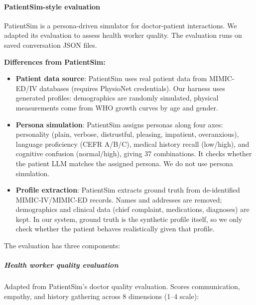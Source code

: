 
\paragraph{PatientSim-style evaluation}

PatientSim is a persona-driven simulator for doctor-patient interactions. We adapted its evaluation to assess health worker quality. The evaluation runs on saved conversation JSON files.

\textbf{Differences from PatientSim:}
\begin{itemize}
    \item \textbf{Patient data source}: PatientSim uses real patient data from MIMIC-ED/IV databases (requires PhysioNet credentials). Our harness uses generated profiles: demographics are randomly simulated, physical measurements come from WHO growth curves by age and gender.
    \item \textbf{Persona simulation}: PatientSim assigns personas along four axes: personality (plain, verbose, distrustful, pleasing, impatient, overanxious), language proficiency (CEFR A/B/C), medical history recall (low/high), and cognitive confusion (normal/high), giving 37 combinations. It checks whether the patient LLM matches the assigned persona. We do not use persona simulation.
    \item \textbf{Profile extraction}: PatientSim extracts ground truth from de-identified MIMIC-IV/MIMIC-ED records. Names and addresses are removed; demographics and clinical data (chief complaint, medications, diagnoses) are kept. In our system, ground truth is the synthetic profile itself, so we only check whether the patient behaves realistically given that profile.
\end{itemize}

The evaluation has three components:

\subparagraph{Health worker quality evaluation}
Adapted from PatientSim's doctor quality evaluation. Scores communication, empathy, and history gathering across 8 dimensions (1--4 scale):

